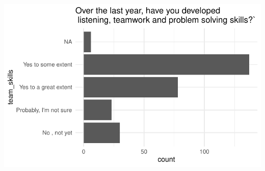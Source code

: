 \documentclass[
  12pt]{article}
\begin{document}
\includegraphics{Journal_article_files/figure-pdf/unnamed-chunk-16-3.pdf}


\renewcommand\refname{BibTex}
  
\end{document}
